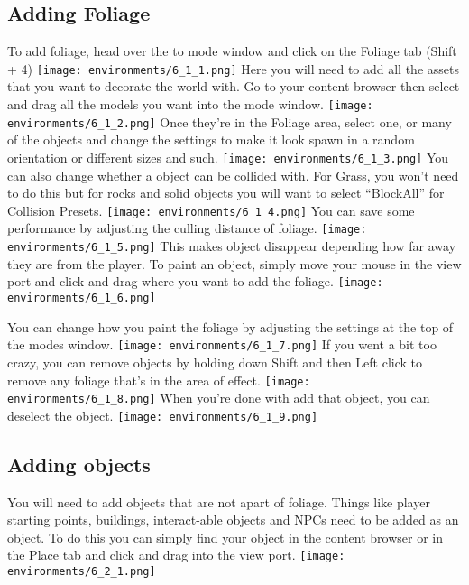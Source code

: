 \documentclass[../main.tex]{subfiles}
\begin{document}
\subsection{Adding Foliage}
To add foliage, head over the to mode window and click on the Foliage tab (Shift + 4)
\texttt{[image: environments/6\_1\_1.png]}
Here you will need to add all the assets that you want to decorate the world with.
Go to your content browser then select and drag all the models you want into the mode window.
\texttt{[image: environments/6\_1\_2.png]}
Once they’re in the Foliage area, select one, or many of the objects and change the settings to make it look spawn in a random orientation or different sizes and such.
\texttt{[image: environments/6\_1\_3.png]}
You can also change whether a object can be collided with. For Grass, you won’t need to do this but for rocks and solid objects you will want to select “BlockAll” for Collision Presets. 
\texttt{[image: environments/6\_1\_4.png]}
You can save some performance by adjusting the culling distance of foliage.
\texttt{[image: environments/6\_1\_5.png]}
This makes object disappear depending how far away they are from the player.
To paint an object, simply move your mouse in the view port and click and drag where you want to add the foliage.
\texttt{[image: environments/6\_1\_6.png]}

You can change how you paint the foliage by adjusting the settings at the top of the modes window.
\texttt{[image: environments/6\_1\_7.png]}
If you went a bit too crazy, you can remove objects by holding down Shift and then Left click to remove any foliage that’s in the area of effect.
\texttt{[image: environments/6\_1\_8.png]}
When you’re done with add that object, you can deselect the object.
\texttt{[image: environments/6\_1\_9.png]}

\subsection{Adding objects}
You will need to add objects that are not apart of foliage. Things like player starting points, buildings, interact-able objects and NPCs need to be added as an object.
To do this you can simply find your object in the content browser or in the Place tab and click and drag into the view port.
\texttt{[image: environments/6\_2\_1.png]}
\end{document}

